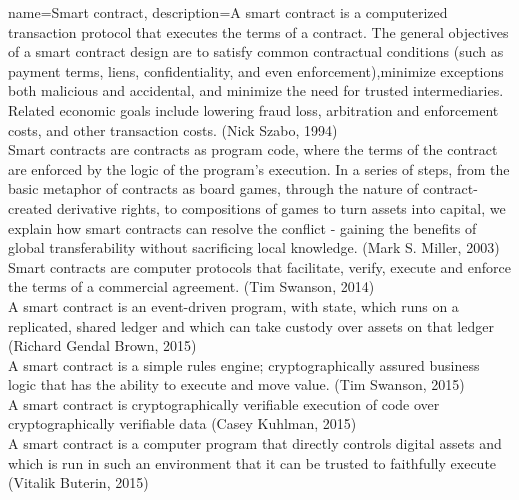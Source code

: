 \documentclass[a4paper, 12pt]{scrartcl}
\begin{document}
{
  name={Smart contract},
  description={A smart contract is a computerized transaction protocol that executes the terms of a contract. The general objectives of a smart contract design are to satisfy common contractual conditions (such as payment terms, liens, confidentiality, and even enforcement),minimize exceptions both malicious and accidental, and minimize the need for trusted intermediaries. Related economic goals include lowering fraud loss, arbitration and enforcement costs, and other transaction costs. (Nick Szabo, 1994)\\

  Smart contracts are contracts as program code, where the terms of the contract are enforced by the logic of the program's execution. In a series of steps, from the basic metaphor of contracts as board games, through the nature of contract-created derivative rights, to compositions of games to turn assets into capital, we explain how smart contracts can resolve the conflict - gaining the benefits of global transferability without sacrificing local knowledge. (Mark S. Miller, 2003) \\

  Smart contracts are computer protocols that facilitate, verify, execute and enforce the terms of a commercial agreement. (Tim Swanson, 2014) \\

  A smart contract is an event-driven program, with state, which runs on a replicated, shared ledger and which can take custody over assets on that ledger (Richard Gendal Brown, 2015)\\

  A smart contract is a simple rules engine; cryptographically assured business logic that has the ability to execute and move value. (Tim Swanson, 2015)\\

  A smart contract is cryptographically verifiable execution of code over cryptographically verifiable data (Casey Kuhlman, 2015)\\

  A smart contract is a computer program that directly controls digital assets and which is run in such an environment that it can be trusted to faithfully execute (Vitalik Buterin, 2015)}
}
\printglossaries
\end{document}
